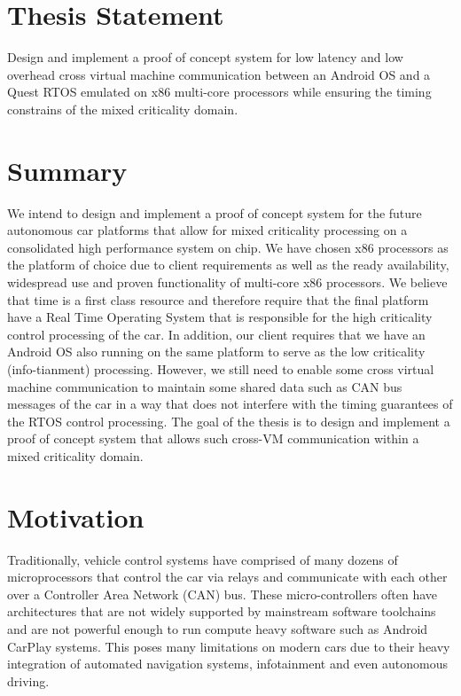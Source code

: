 \documentclass[12pt]{article}
\begin{document}
\tableofcontents
\pagebreak

\section{Thesis Statement}
\begin{center}
\large Design and implement a proof of concept system for low latency and low overhead cross virtual machine communication between an Android OS and a Quest RTOS emulated on x86 multi-core processors while ensuring the timing constrains of the mixed criticality domain.
\end{center}


\section{Summary}
We intend to design and implement a proof of concept system for the future autonomous car platforms that allow for mixed criticality processing on a consolidated high performance system on chip. We have chosen x86 processors as the platform of choice due to client requirements as well as the ready availability, widespread use and proven functionality of multi-core x86 processors. We believe that time is a first class resource and therefore require that the final platform have a Real Time Operating System that is responsible for the high criticality control processing of the car. In addition, our client requires that we have an Android OS also running on the same platform to serve as the low criticality (info-tianment) processing. However, we still need to enable some cross virtual machine communication to maintain some shared data such as CAN bus messages of the car in a way that does not interfere with the timing guarantees of the RTOS control processing. The goal of the thesis is to design and implement a proof of concept system that allows such cross-VM communication within a mixed criticality domain.


\section{Motivation}
Traditionally, vehicle control systems have comprised of many dozens of microprocessors that control the car via relays and communicate with each other over a Controller Area Network (CAN) bus. These micro-controllers often have architectures that are not widely supported by mainstream software toolchains and are not powerful enough to run compute heavy software such as Android CarPlay systems. This poses many limitations on modern cars due to their heavy integration of automated navigation systems, infotainment and even autonomous driving.
\end{document}
